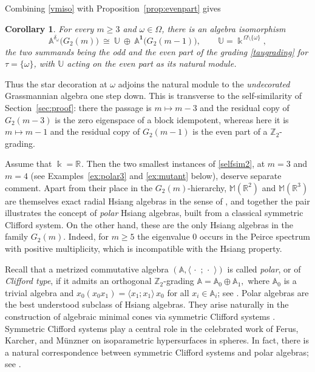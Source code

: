 \documentclass[times,11pt,reqno]{amsproc}
\newtheorem{corollary}[theorem]{Corollary}
\theoremstyle{definition}
\numberwithin{equation}{section}
\def\R#1{\mathbb{R}^{#1}}
\def\scal#1#2{\langle #1; #2 \rangle}
\newcommand\fie{\Bbbk}
\def\alg{\mathbb{A}}
\def\ualg{\mathbb{U}}
\newcommand{\dum}{\,\cdot\,\,}
\def\ualg{\mathbb{U}}
\def\malg{\mathbb{M}}
\newcommand{\vm}[1]{\malg(#1)}
\begin{document}
Combining \eqref{vmiso} with Proposition~\ref{prop:evenpart} gives

\begin{corollary}\label{cor:selfsim2}
For every $m\ge3$ and $\omega\in\Omega$, there is an algebra isomorphism
\begin{equation}\label{selfsim2}
\alg^{\delta_\omega}\bigl(G_2(m)\bigr)
\ \cong\
\ualg\ \oplus\ \alg^{\mathbf 1}\bigl(G_2(m-1)\bigr),
\qquad
\ualg=\fie^{\,\Omega\setminus\{\omega\}},
\end{equation}
the two summands being the odd and the even part of the grading
\eqref{taugrading} for $\tau=\{\omega\}$, with $\ualg$ acting on the even
part as its natural module.
\end{corollary}

Thus the star decoration at $\omega$ adjoins the natural module to the
\emph{undecorated} Grassmannian algebra one step down. This is transverse
to the self-similarity of Section~\ref{sec:proof}: there the passage is
$m\mapsto m-3$ and the residual copy of $G_2(m-3)$ is the zero eigenspace
of a block idempotent, whereas here it is $m\mapsto m-1$ and the residual
copy of $G_2(m-1)$ is the even part of a $\mathbb Z_2$-grading.



Assume that $\fie=\R{}$. Then the two smallest instances of \eqref{selfsim2}, at $m=3$ and $m=4$ (see Examples~\ref{ex:polar3} and \ref{ex:mutant} below),
deserve separate comment. Apart from their place in the
$G_2(m)$-hierarchy, $\vm{\mathbb R^2}$ and $\vm{\mathbb R^3}$ are
themselves exact radial Hsiang algebras in the sense of
\cite{Fox-Tkachev,Nadirashvili-Tkachev-Vladuts}, and together the pair
illustrates the concept of \emph{polar}
Hsiang algebras, built from a classical symmetric Clifford system. On the other hand, these are the only Hsiang algebras in the family $G_2(m)$. Indeed, for $m\ge 5$ the eigenvalue $0$ occurs in the Peirce spectrum with positive multiplicity, which is incompatible with the Hsiang property.

Recall that a metrized commutative algebra $(\alg,\scal{\dum}{\dum})$ is called
\emph{polar}, or of \emph{Clifford type},  if it admits an orthogonal $\mathbb Z_2$-grading
$
\alg=\alg_0\oplus\alg_1,
$
where $\alg_0$ is a trivial algebra and $x_0(x_0x_1)=\scal{x_1}{x_1}\,x_0$
for all $x_i\in\alg_i$; see \cite{Fox-Tkachev}. Polar algebras are the best understood subclass of Hsiang algebras. They arise naturally in the construction of algebraic minimal cones via symmetric Clifford systems \cite{Tkachev-cliff}. Symmetric Clifford systems play a central role in the celebrated work of Ferus, Karcher, and M\"unzner \cite{Ferus-Karcher-Munzner} on isoparametric hypersurfaces in spheres. In fact, there is a natural correspondence between symmetric Clifford systems and polar algebras; see \cite[Section~6.5]{Nadirashvili-Tkachev-Vladuts}.
\end{document}
